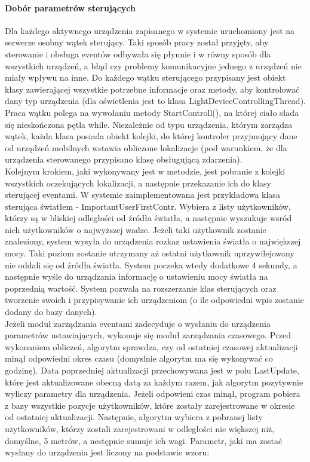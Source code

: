 \documentclass{article}
\begin{document}
		\paragraph{Dobór parametrów sterujących}
		Dla każdego aktywnego urządzenia zapisanego w systemie uruchomiony jest na serwerze osobny wątek sterujący. Taki sposób pracy został przyjęty, aby sterowanie i obsługa eventów odbywała się płynnie i w równy sposób dla wszystkich urządzeń, a błąd czy problemy komunikacyjne jednego z urządzeń nie miały wpływu na inne. Do każdego wątku sterującego przypisany jest obiekt klasy zawierającej wszystkie potrzebne informacje oraz metody, aby kontrolować dany typ urządzenia (dla oświetlenia jest to klasa LightDeviceControllingThread).\\
		Praca wątku polega na wywołaniu metody StartControll(), na której ciało słada się nieskończona pętla while. Niezależnie od typu urządzenia, którym zarządza wątek, każda klasa posiada obiekt kolejki, do której kontroler przyjmujący dane od urządzeń mobilnych wstawia obliczone lokalizacje (pod warunkiem, że dla urządzenia sterowanego przypisano klasę obsługującą zdarzenia).\\
		Kolejnym krokiem, jaki wykonywany jest w metodzie, jest pobranie z kolejki wszystkich oczekujących lokalizacji, a następnie przekazanie ich do klasy sterującej eventami. W systemie zaimplementowana jest przykładowa klasa sterująca światłem - ImportantUserFirstContr. Wybiera z listy użytkowników, którzy są w bliskiej odległości od źródła światła, a następnie wyszukuje wsród nich użytkowników o najwyższej wadze. Jeżeli taki użytkownik zostanie znaleziony, system wysyła do urządzenia rozkaz ustawienia światła o największej mocy. Taki poziom zostanie utrzymany aż ostatni użytkownik uprzywilejowany nie oddali się od źródła światła. System poczeka wtedy dodatkowe 4 sekundy, a następnie wyśle do urządzania informację o ustawieniu mocy światła na poprzednią wartość. System pozwala na rozszerzanie klas sterujących oraz tworzenie swoich i przypisywanie ich urządzeniom (o ile odpowiedni wpis zostanie dodany do bazy danych).\\
		Jeżeli moduł zarządzania eventami zadecyduje o wysłaniu do urządzenia parametrów ustawiających, wykonuje się moduł zarządzania czasowego. Przed wykonaniem obliczeń, algorytm sprawdza, czy od ostatniej czasowej aktualizacji minął odpowiedni okres czasu (domyslnie algorytm ma się wykonywać co godzinę). Data poprzedniej aktualizacji przechowywana jest w polu LastUpdate, które jest aktualizowane obecną datą za każdym razem, jak algorytm pozytywnie wyliczy parametry dla urządzenia. Jeżeli odpowieni czas minął, program pobiera z bazy wszystkie pozycje użytkowników, które zostały zarejestrowane w okresie od ostatniej aktualizacji. Następnie, algorytm wybiera z pobranej listy użytkowników, którzy zostali zarejestrowani w odległości nie większej niż, domyślne, 5 metrów, a nestępnie sumuje ich wagi. Parametr, jaki ma zostać wysłany do urządzenia jest liczony na podstawie wzoru:
\end{document}

